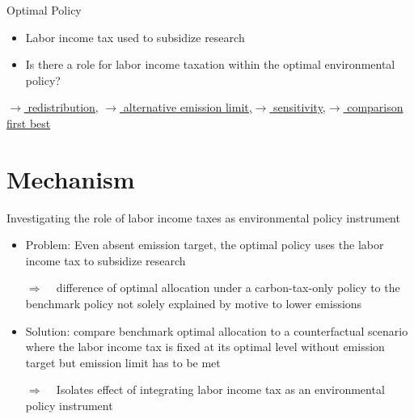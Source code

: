 \documentclass[11pt,aspectratio=169]{beamer}
\newcommand{\ar}{$\Rightarrow$ \ }
\begin{document}
\begin{frame}{Optimal Policy}
	\vspace{3mm}
\begin{block}{}
	\begin{itemize}
		\item Labor income tax used to subsidize research
		\item Is there a role for labor income taxation within the optimal environmental policy?
	\end{itemize}
\end{block}	
\hypertarget{backOPT}{}
\vspace{-4mm}
\hfill

\hyperlink{Redis}{\tiny{$\rightarrow$ redistribution,}}
\hyperlink{altems}{\tiny{$\rightarrow$ alternative emission limit,}}\hyperlink{sensphi}{\tiny{$\rightarrow$ sensitivity,}}\hyperlink{compfb}{\tiny{$\rightarrow$ comparison first best}}
\end{frame}


\section*{Mechanism}

\begin{frame}{Investigating the role of labor income taxes as environmental policy instrument}
	

	\begin{itemize}
		\item 	\alert{Problem: Even absent emission target, the optimal policy uses the labor income tax to subsidize research}
				\vspace{3mm}
		\item[\ar] difference of optimal allocation under a carbon-tax-only policy to the benchmark policy not solely explained by motive to lower emissions %
				\vspace{3mm}
		\item Solution: compare benchmark optimal allocation to a counterfactual scenario where the labor income tax is fixed at its optimal level without emission target but emission limit has to be met
				\vspace{3mm}
		\item[\ar] Isolates effect of integrating labor income tax as an environmental policy instrument 
	\end{itemize}
%
\end{frame}
\end{document}
